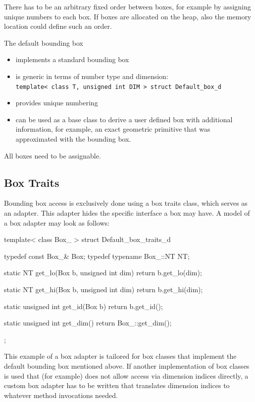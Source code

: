 There has to be an arbitrary fixed order between boxes, for example by
assigning unique numbers to each box. If boxes are allocated on the
heap, also the memory location could define such an order.

The default bounding box
\begin{itemize}
  \item implements a standard bounding box
  \item is generic in terms of number type and dimension: \\
  \texttt{template< class T, unsigned int DIM > struct Default\_box\_d}
  \item provides unique numbering
  \item can be used as a base class to derive a user defined box with
  additional information, for example, an exact geometric primitive
  that was approximated with the bounding box.
\end{itemize}

All boxes need to be assignable.

\subsection*{Box Traits}
Bounding box access is exclusively done using a box traits class, which serves as an adapter. This adapter hides the specific interface a box may have. A model of a box adapter may look as follows:
\begin{ccExampleCode}
template< class Box_ >
struct Default_box_traits_d {
    typedef const Box_&       Box;
    typedef typename Box_::NT NT;

    static NT get_lo(Box b, unsigned int dim)
    { return b.get_lo(dim); }

    static NT get_hi(Box b, unsigned int dim)
    { return b.get_hi(dim); }

    static unsigned int get_id(Box b)
    { return b.get_id();     }

    static unsigned int get_dim() { return Box_::get_dim(); }
};
\end{ccExampleCode}

This example of a box adapter is tailored for box classes that implement the default bounding box mentioned above. If another implementation of box classes is used that (for example) does not allow access via dimension indices directly, a custom box adapter has to be written that translates dimension indices to whatever method invocations needed.

